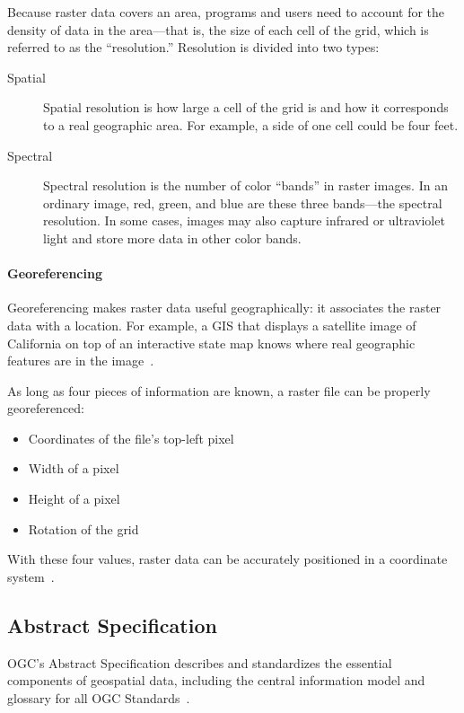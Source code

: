 Because raster data covers an area, programs and users need to account for the density of data in the area---that is, the size of each cell of the grid, which is referred to as the ``resolution.'' Resolution is divided into two types:

\begin{description}
  \item[Spatial] Spatial resolution is how large a cell of the grid is and how it corresponds to a real geographic area. For example, a side of one cell could be four feet.
  \item[Spectral] Spectral resolution is the number of color ``bands'' in raster images. In an ordinary image, red, green, and blue are these three bands---the spectral resolution. In some cases, images may also capture infrared or ultraviolet light and store more data in other color bands.
\end{description}

\paragraph{Georeferencing}
Georeferencing makes raster data useful geographically: it associates the raster data with a location. For example, a GIS that displays a satellite image of California on top of an interactive state map knows where real geographic features are in the image~\cite{gentle_intro}.

As long as four pieces of information are known, a raster file can be properly georeferenced:

\begin{itemize}
  \item Coordinates of the file's top-left pixel
  \item Width of a pixel
  \item Height of a pixel
  \item Rotation of the grid
\end{itemize}

With these four values, raster data can be accurately positioned in a coordinate system~\cite{gentle_intro}.

\subsection{Abstract Specification}
OGC's Abstract Specification describes and standardizes the essential components of geospatial data, including the central information model and glossary for all OGC Standards~\cite{AbstractSpecFaq}.

